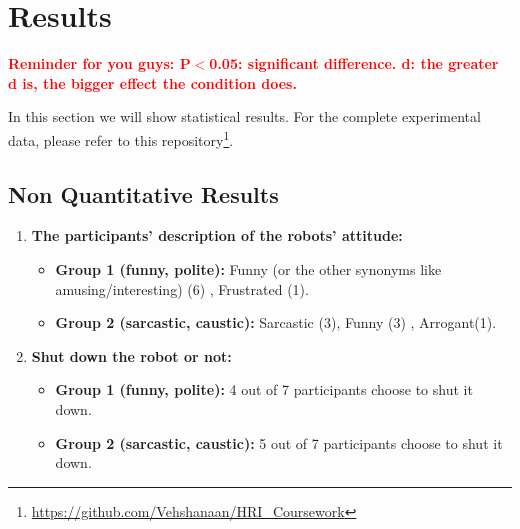 \documentclass[conference]{IEEEtran}
\begin{document}
\section{Results}

\textbf{\textcolor{red}{Reminder for you guys: P$<$0.05: significant difference. d: the greater d is, the bigger effect the condition does.}}

In this section we will show statistical results. For the complete experimental data, please refer to this repository\footnote[1]{\url{https://github.com/Vehshanaan/HRI_Coursework}}.

\subsection{Non Quantitative Results}



\begin{enumerate}
    \item \textbf{The participants' description of the robots' attitude:}
    \begin{itemize}
    \item \textbf{Group 1 (funny, polite):} Funny (or the other synonyms like amusing/interesting) (6) , Frustrated (1).
    \item \textbf{Group 2 (sarcastic, caustic):} Sarcastic (3), Funny (3) , Arrogant(1). 
    \end{itemize}
    \item \textbf{Shut down the robot or not:}
    \begin{itemize}
    \item \textbf{Group 1 (funny, polite):} 4 out of 7 participants choose to shut it down.
    \item \textbf{Group 2 (sarcastic, caustic):} 5 out of 7 participants choose to shut it down. 
    \end{itemize}
\end{enumerate}
\end{document}
